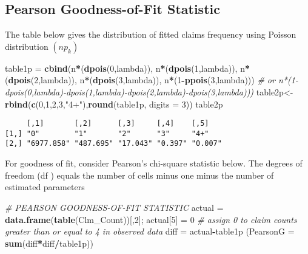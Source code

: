 \documentclass[]{book}
\newenvironment{Shaded}{\begin{snugshade}}{\end{snugshade}}
\newcommand{\KeywordTok}[1]{\textcolor[rgb]{0.13,0.29,0.53}{\textbf{#1}}}
\newcommand{\DataTypeTok}[1]{\textcolor[rgb]{0.13,0.29,0.53}{#1}}
\newcommand{\DecValTok}[1]{\textcolor[rgb]{0.00,0.00,0.81}{#1}}
\newcommand{\StringTok}[1]{\textcolor[rgb]{0.31,0.60,0.02}{#1}}
\newcommand{\CommentTok}[1]{\textcolor[rgb]{0.56,0.35,0.01}{\textit{#1}}}
\newcommand{\OperatorTok}[1]{\textcolor[rgb]{0.81,0.36,0.00}{\textbf{#1}}}
\newcommand{\NormalTok}[1]{#1}
\theoremstyle{definition}
\theoremstyle{definition}
\theoremstyle{definition}
\theoremstyle{remark}
\begin{document}
\subsection{Pearson Goodness-of-Fit
Statistic}\label{pearson-goodness-of-fit-statistic-1}

The table below gives the distribution of fitted claims frequency using
Poisson distribution \((np_k)\)

\begin{Shaded}
\begin{Highlighting}[]
\NormalTok{table1p =}\StringTok{ }\KeywordTok{cbind}\NormalTok{(n}\OperatorTok{*}\NormalTok{(}\KeywordTok{dpois}\NormalTok{(}\DecValTok{0}\NormalTok{,lambda)),}
\NormalTok{                n}\OperatorTok{*}\NormalTok{(}\KeywordTok{dpois}\NormalTok{(}\DecValTok{1}\NormalTok{,lambda)),}
\NormalTok{                n}\OperatorTok{*}\NormalTok{(}\KeywordTok{dpois}\NormalTok{(}\DecValTok{2}\NormalTok{,lambda)),}
\NormalTok{                n}\OperatorTok{*}\NormalTok{(}\KeywordTok{dpois}\NormalTok{(}\DecValTok{3}\NormalTok{,lambda)),}
\NormalTok{                n}\OperatorTok{*}\NormalTok{(}\DecValTok{1}\OperatorTok{-}\KeywordTok{ppois}\NormalTok{(}\DecValTok{3}\NormalTok{,lambda))) }\CommentTok{# or n*(1-dpois(0,lambda)-dpois(1,lambda)-dpois(2,lambda)-dpois(3,lambda)))}
\NormalTok{table2p<-}\KeywordTok{rbind}\NormalTok{(}\KeywordTok{c}\NormalTok{(}\DecValTok{0}\NormalTok{,}\DecValTok{1}\NormalTok{,}\DecValTok{2}\NormalTok{,}\DecValTok{3}\NormalTok{,}\StringTok{"4+"}\NormalTok{),}\KeywordTok{round}\NormalTok{(table1p, }\DataTypeTok{digits =} \DecValTok{3}\NormalTok{))}
\NormalTok{table2p}
\end{Highlighting}
\end{Shaded}

\begin{verbatim}
     [,1]       [,2]      [,3]     [,4]    [,5]   
[1,] "0"        "1"       "2"      "3"     "4+"   
[2,] "6977.858" "487.695" "17.043" "0.397" "0.007"
\end{verbatim}

For goodness of fit, consider Pearson's chi-square statistic below. The
degrees of freedom (df ) equals the number of cells minus one minus the
number of estimated parameters

\begin{Shaded}
\begin{Highlighting}[]
\CommentTok{#  PEARSON GOODNESS-OF-FIT STATISTIC}
\NormalTok{actual =}\StringTok{ }\KeywordTok{data.frame}\NormalTok{(}\KeywordTok{table}\NormalTok{(Clm_Count))[,}\DecValTok{2}\NormalTok{];}
\NormalTok{actual[}\DecValTok{5}\NormalTok{] =}\StringTok{ }\DecValTok{0}  \CommentTok{# assign 0 to claim counts greater than or equal to 4 in observed data}
\NormalTok{diff =}\StringTok{ }\NormalTok{actual}\OperatorTok{-}\NormalTok{table1p}
\NormalTok{(}\DataTypeTok{PearsonG =} \KeywordTok{sum}\NormalTok{(diff}\OperatorTok{*}\NormalTok{diff}\OperatorTok{/}\NormalTok{table1p))}
\end{Highlighting}
\end{Shaded}
\end{document}
